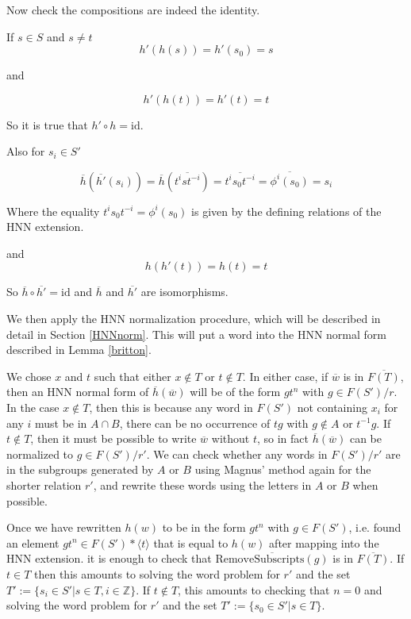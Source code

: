 \documentclass[12pt]{article} %
\theoremstyle{definition}
\theoremstyle{definition}
\theoremstyle{definition}
\theoremstyle{definition}
\theoremstyle{definition}
\theoremstyle{definition}
\begin{document}
Now check the compositions are indeed the identity.

If $s \in S$ and $s \ne t$
\begin{equation}
  h'(h(s)) = h'(s_0) = s
\end{equation}

and

\begin{equation}
  h'(h(t)) = h'(t) = t
\end{equation}

So it is true that $h' \circ h = \text{id}$.

Also for $s_i \in S'$

\begin{equation}
  \overline{h}(\overline{h'}(s_i)) = \overline{h}(\overline{t^i s t^{-i}}) =
  \overline{t^i s_0 t^{-i}} = \overline{\phi^i(s_0)} = s_i
\end{equation}

Where the equality $t^i s_0 t^{-i} = \phi^i(s_0)$ is given by the defining relations
of the HNN extension.

and
\begin{equation}
  h(h'(t)) = h(t) = t
\end{equation}

So $\overline{h} \circ \overline{h'} = \text{id}$ and $\overline{h}$ and $\overline{h'}$ are isomorphisms.

We then apply the HNN normalization procedure, which will be described in detail in Section
\ref{HNNnorm}. This
will put a word into the HNN normal form described in Lemma \ref{britton}.

We chose $x$ and $t$ such that either $x \notin T$ or $t \notin T$.
In either case, if $\overline{w}$ is in $\overline{F(T)}$,
then an HNN normal form of $\overline{h}(\overline{w})$ will be of the form $g t^n$
with $g \in F(S') / r$. In the case $x \notin T$, then this is because any word in
$F(S')$ not containing $x_i$ for any $i$ must be in $A \cap B$, there can be no occurrence of
$tg$ with $g \notin A$ or $t^{-1}g.$
If $t \notin T$, then it must be possible to write $\overline{w}$ without $t$,
so in fact $\overline{h}(\overline{w})$ can be normalized
to $g \in F(S') / r'$. We can check whether any words in $F(S') / r'$ are in the subgroups
generated by $A$ or $B$ using
Magnus' method again for the shorter relation $r'$, and rewrite these words using the letters
in $A$ or $B$ when possible.

Once we have rewritten $h(w)$ to be in the form $g t^n$ with $g \in F(S')$, i.e.
found an element $gt^n \in F(S') \ast \langle t \rangle$ that is equal to $h(w)$ after
mapping into the HNN extension.
it is enough to check that
$\overline{\text{RemoveSubscripts}(g)}$ is in $\overline{F(T)}$.
If $t \in T$ then this amounts to solving the word problem for $r'$
and the set $T' := \{ s_i \in S' | s \in T, i \in \mathbb{Z} \}$.
If $t \notin T$,
this amounts to checking that $n = 0$ and solving the word problem for
$r'$ and the set $T' := \{s_0 \in S' | s \in T\}$.
\end{document}
